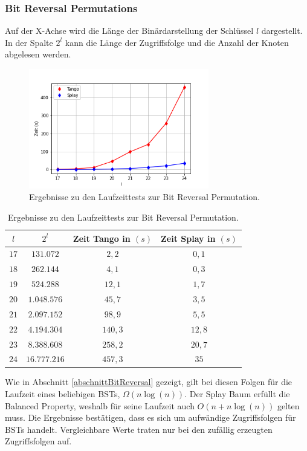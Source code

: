 \documentclass[a4paper,12pt]{article}
\begin{document}
\subsubsection{Bit Reversal Permutations}
Auf der X-Achse wird die Länge der Binärdarstellung der Schlüssel $l$ dargestellt. In der Spalte $2^l$ kann die Länge der Zugriffsfolge und die Anzahl der Knoten abgelesen werden. 
\begin{figure}[H]
	\centering
	\includegraphics[width=0.7\textwidth]{Medien/laufzeittest/diagramm/brp}
	\caption{Ergebnisse zu den Laufzeittests zur Bit Reversal Permutation.}
	\label{fig:ResultGUI}
\end{figure}
\begin{table}[H]
	\begin{center}
		\begin{tabular}[c]{|c|c|c|c|}
			\hline
			$l$ & $2^l$ &Zeit Tango in $\left(s\right)$ &Zeit Splay in $\left(s\right)$ \\
			\hline
			$17$ &	$131.072 $ &$2,2$ &$0,1$ \\
			\hline
			$18$  &$262.144 $ &$4,1$ &$0,3$  \\
			\hline
			$19$  &$524.288 $ &$12,1$ &$1,7$  \\
			\hline
			$20$  &$1.048.576 $ &$45,7$ &$3,5$  \\
			\hline
			$21$  &$2.097.152 $ &$98,9$ &$5,5$  \\
			\hline
			$22$  &$4.194.304 $ &$140,3$ &$12,8$  \\
			\hline
			$23$  &$8.388.608 $ &$258,2$ &$20,7$  \\
			\hline
			$24$  &$16.777.216$ &$457,3$ &$35$  \\
			\hline
		\end{tabular}
		\caption{Ergebnisse zu den Laufzeittests zur Bit Reversal Permutation.} 
	\end{center}
\end{table}
\noindent Wie in Abschnitt \ref{abschnittBitReversal} gezeigt, gilt bei diesen Folgen für die Laufzeit eines beliebigen BSTs, $\Omega \left(n \log\left(n\right)\right)$. Der Splay Baum erfüllt die Balanced Property, weshalb für seine Laufzeit auch $O\left(n + n \log\left(n\right)\right)$ gelten muss. Die Ergebnisse bestätigen, dass es sich um aufwändige Zugriffsfolgen für BSTs handelt. Vergleichbare Werte traten nur bei den zufällig erzeugten Zugriffsfolgen auf. \\
\end{document}
